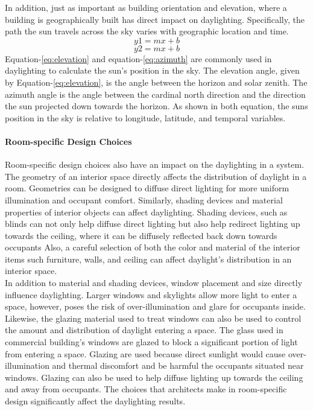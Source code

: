     In addition, just as important as building orientation and elevation, where a building is geographically built has direct impact on daylighting.
    Specifically, the path the sun travels across the sky varies with geographic location and time.
    \begin{equation} \label{eq:elevation}
    y1 = mx + b
    \end{equation}
    \begin{equation} \label{eq:azimuth}
    y2 = mx + b
    \end{equation}
    Equation-\ref{eq:elevation} and equation-\ref{eq:azimuth} are commonly used in daylighting to calculate the sun's position in the sky. 
    The elevation angle, given by Equation-\ref{eq:elevation}, is the angle between the horizon and solar zenith.
    The azimuth angle is the angle between the cardinal north direction and the direction the sun projected down towards the horizon.
    As shown in both equation, the suns position in the sky is relative to longitude, latitude, and temporal variables.\\

    \paragraph{Room-specific Design Choices} 
    Room-specific design choices also have an impact on the daylighting in a system.
    The geometry of an interior space directly affects the distribution of daylight in a room.
    Geometries can be designed to diffuse direct lighting for more uniform illumination and occupant comfort.
    Similarly, shading devices and material properties of interior objects can affect daylighting.
    Shading devices, such as blinds can not only help diffuse direct lighting but also help redirect lighting up towards the ceiling, where it can be diffusely reflected back down towards occupants 
    Also, a careful selection of both the color and material of the interior items such furniture, walls, and ceiling can affect daylight's distribution in an interior space.\\

    In addition to material and shading devices, window placement and size directly influence daylighting.
    Larger windows and skylights allow more light to enter a space, however, poses the risk of over-illumination and glare for occupants inside.
    Likewise, the glazing material used to treat windows can also be used to control the amount and distribution of daylight entering a space.
    The glass used in commercial building's windows are glazed to block a significant portion of light from entering a space.
    Glazing are used because direct sunlight would cause over-illumination and thermal discomfort and be harmful the occupants situated near windows.
    Glazing can also be used to help diffuse lighting up towards the ceiling and away from occupants.
    The choices that architects make in room-specific design significantly affect the daylighting results.\\

